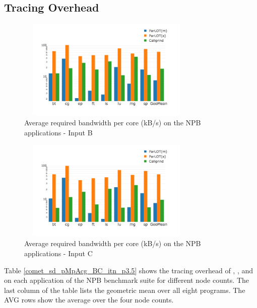 
\subsection{Tracing Overhead}
\label{subsec:lowtoh}


\begin{figure}[t]
\centering
\includegraphics[width=3.4in,height=1.9in]{parlot/figs.comet.newMed/comet_chartAvg_bw_B_p3_5.png}
\caption{  Average required bandwidth per core (kB/s) on the NPB applications - Input B}
\label{comet_chartAvg_bw_B_p3_5}
\end{figure}

\begin{figure}[t]
\centering
\includegraphics[width=3.4in,height=1.9in]{parlot/figs.comet.newMed/comet_chartAvg_bw_C_p3_5.png}
\caption{ Average required bandwidth per core (kB/s) on the NPB applications - Input C}
\label{comet_chartAvg_bw_C_p3_5}
\end{figure}


Table \ref{comet_sd_pMpAcg_BC_itn_p3.5} shows the tracing overhead of \parlotm, \parlota, and \callgrind on each application of the NPB benchmark suite for different node counts. The last column of the table lists the geometric mean over all eight programs. The AVG rows show the average over the four node counts.


